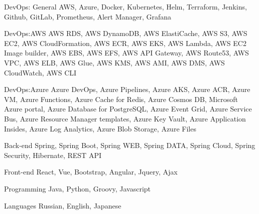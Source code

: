 

\begin{cvskills}

  \cvskill
    {DevOps: General} %
    {AWS, Azure, Docker, Kubernetes, Helm, Terraform, Jenkins, Github, GitLab, Prometheus, Alert Manager, Grafana } %

  \cvskill
    {DevOps:AWS} %
    {AWS RDS, AWS DynamoDB, AWS ElastiCache, AWS S3, AWS EC2, AWS CloudFormation,
     AWS ECR, AWS EKS, AWS Lambda, AWS EC2 Image builder, AWS EBS, AWS EFS, AWS API Gateway,
      AWS Route53, AWS VPC, AWS ELB, AWS Glue, AWS KMS, AWS AMI, AWS DMS, AWS CloudWatch, AWS CLI} %

  \cvskill
    {DevOps:Azure} %
    {Azure DevOps, Azure Pipelines, Azure AKS, Azure ACR, Azure VM, Azure Functions, Azure Cache for Redis,
     Azure Cosmos DB, Microsoft Azure portal, Azure Database for PostgreSQL, Azure Event Grid, Azure Service Bus,
      Azure Resource Manager templates, Azure Key Vault, Azure Application Insides, Azure Log Analytics, Azure Blob Storage, Azure Files} %

  \cvskill
    {Back-end} %
    {Spring, Spring Boot, Spring WEB, Spring DATA, Spring Cloud, Spring Security, Hibernate, REST API} %

  \cvskill
    {Front-end} %
    {React, Vue, Bootstrap, Angular, Jquery, Ajax} %

  \cvskill
    {Programming} %
    {Java, Python, Groovy, Javascript} %

  \cvskill
    {Languages} %
    {Russian, English, Japanese} %

\end{cvskills}
